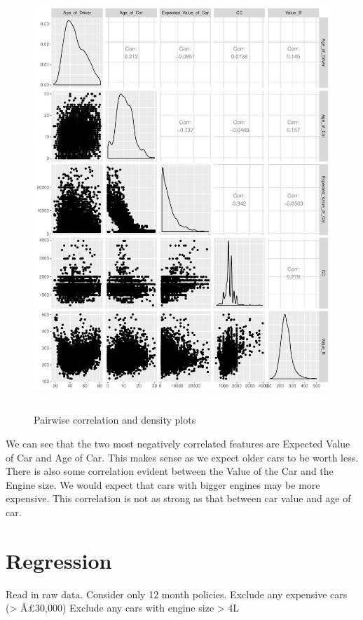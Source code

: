\begin{figure}[!h]
  \centering
  \includegraphics[width = 16cm, height = 16cm]{ggpairs_valueB_sample_5000.pdf}
  \caption{Pairwise correlation and density plots}
  \label{fig:ggpairs_corr}
\end{figure}

We can see that the two most negatively correlated features are Expected Value of Car and Age of Car. This makes sense as we expect older cars to be worth less. There is also some correlation evident between the Value of the Car and the Engine size. We would expect that cars with bigger engines may be more expensive. This correlation is not as strong as that between car value and age of car.



\section{Regression}

  Read in raw data.
  Consider only 12 month policies.
  Exclude any expensive cars (\textgreater{} Â£30,000)
  Exclude any cars with engine size \textgreater{} 4L

